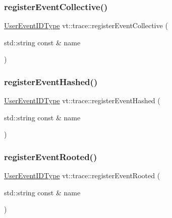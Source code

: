 \mbox{\label{namespacevt_1_1trace_a91e24c3e4f4145f8178050065befeda6}} 
\subsubsection{\texorpdfstring{register\+Event\+Collective()}{registerEventCollective()}}
{\footnotesize\ttfamily \hyperlink{namespacevt_1_1trace_a5908920d051c144c89f17c69ed262350}{User\+Event\+I\+D\+Type} vt\+::trace\+::register\+Event\+Collective (\begin{DoxyParamCaption}\item[{std\+::string const \&}]{name }\end{DoxyParamCaption})}

\mbox{\label{namespacevt_1_1trace_a9d0309860e6216c541fe5c3af74a5426}} 
\subsubsection{\texorpdfstring{register\+Event\+Hashed()}{registerEventHashed()}}
{\footnotesize\ttfamily \hyperlink{namespacevt_1_1trace_a5908920d051c144c89f17c69ed262350}{User\+Event\+I\+D\+Type} vt\+::trace\+::register\+Event\+Hashed (\begin{DoxyParamCaption}\item[{std\+::string const \&}]{name }\end{DoxyParamCaption})}

\mbox{\label{namespacevt_1_1trace_ab2627c07d28361b471d0b9008de2f20c}} 
\subsubsection{\texorpdfstring{register\+Event\+Rooted()}{registerEventRooted()}}
{\footnotesize\ttfamily \hyperlink{namespacevt_1_1trace_a5908920d051c144c89f17c69ed262350}{User\+Event\+I\+D\+Type} vt\+::trace\+::register\+Event\+Rooted (\begin{DoxyParamCaption}\item[{std\+::string const \&}]{name }\end{DoxyParamCaption})}

